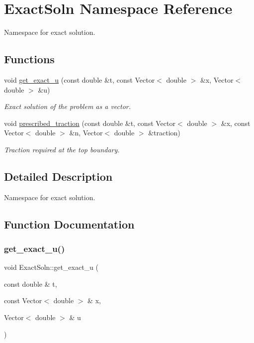\hypertarget{namespaceExactSoln}{}\section{Exact\+Soln Namespace Reference}
\label{namespaceExactSoln}


Namespace for exact solution.  


\subsection*{Functions}
\begin{DoxyCompactItemize}
\item 
void \hyperlink{namespaceExactSoln_a2598550281dd62f4160edb3d0b2e5432}{get\+\_\+exact\+\_\+u} (const double \&t, const Vector$<$ double $>$ \&x, Vector$<$ double $>$ \&u)
\begin{DoxyCompactList}\small\item\em Exact solution of the problem as a vector. \end{DoxyCompactList}\item 
void \hyperlink{namespaceExactSoln_a2a77269d59d7cf56364f0c3b5ae13b41}{prescribed\+\_\+traction} (const double \&t, const Vector$<$ double $>$ \&x, const Vector$<$ double $>$ \&n, Vector$<$ double $>$ \&traction)
\begin{DoxyCompactList}\small\item\em Traction required at the top boundary. \end{DoxyCompactList}\end{DoxyCompactItemize}


\subsection{Detailed Description}
Namespace for exact solution. 

\subsection{Function Documentation}
\mbox{\label{namespaceExactSoln_a2598550281dd62f4160edb3d0b2e5432}} 
\subsubsection{\texorpdfstring{get\+\_\+exact\+\_\+u()}{get\_exact\_u()}}
{\footnotesize\ttfamily void Exact\+Soln\+::get\+\_\+exact\+\_\+u (\begin{DoxyParamCaption}\item[{const double \&}]{t,  }\item[{const Vector$<$ double $>$ \&}]{x,  }\item[{Vector$<$ double $>$ \&}]{u }\end{DoxyParamCaption})}



